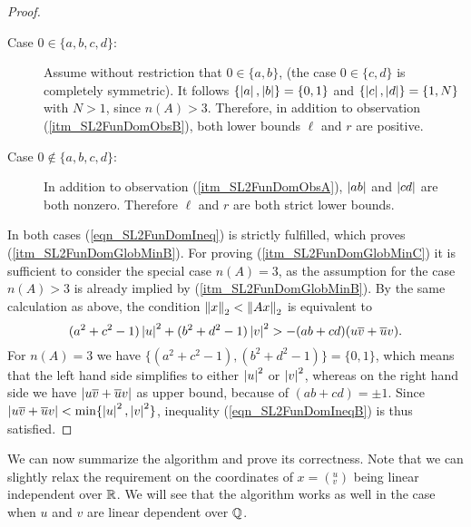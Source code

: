 \begin{proof}
\begin{description}
\item[Case $0 \in \{a,b,c,d\}$:] Assume without restriction that $0 \in \{a,b\}$, (the case $0 \in \{c,d\}$ is completely symmetric). It follows $\{\left|a\right|,\left|b\right|\} = \{0,1\}$ and $\{\left|c\right|,\left|d\right|\} = \{1,N\}$ with $N > 1$, since $n(A) > 3$. Therefore, in addition to observation (\ref{itm_SL2FunDomObsB}), both lower bounds $\ell$ and $r$ are positive. 
\item[Case $0 \notin \{a,b,c,d\}$:] In addition to observation (\ref{itm_SL2FunDomObsA}), $\left|ab\right|$ and $\left|cd\right|$ are both nonzero. Therefore $\ell$ and $r$ are both strict lower bounds.
\end{description}
In both cases (\ref{eqn_SL2FunDomIneq}) is strictly fulfilled, which proves (\ref{itm_SL2FunDomGlobMinB}). For proving (\ref{itm_SL2FunDomGlobMinC}) it is sufficient to consider the special case $n(A) = 3$, as the assumption for the case $n(A) > 3$ is already implied by (\ref{itm_SL2FunDomGlobMinB}). By the same calculation as above, the condition $\left\| x \right\|_2 < \left\| Ax \right\|_2$ is equivalent to
\begin{equation}
\label{eqn_SL2FunDomIneqB}
(a^2 + c^2 - 1)\left|u\right|^2 + (b^2 + d^2 - 1)\left|v\right|^2 > -(ab + cd)(u\overline{v} + \overline{u}v).
\end{equation}
For $n(A) = 3$ we have $\{(a^2 + c^2 - 1),(b^2 + d^2 - 1)\} = \{0,1\}$, which means that the left hand side simplifies to either $\left|u\right|^2$ or $\left|v\right|^2$, whereas on the right hand side we have $\left|u\overline{v} + \overline{u}v\right|$ as upper bound, because of $(ab + cd) = \pm 1$. Since $\left|u\overline{v} + \overline{u}v\right| < \min\{\left|u\right|^2,\left|v\right|^2\}$, inequality (\ref{eqn_SL2FunDomIneqB}) is thus satisfied.
\end{proof}

We can now summarize the algorithm and prove its correctness. Note that we can slightly relax the requirement on the coordinates of $x = ({}^u_v)$ being linear independent over $\mathbb{R}$. We will see that the algorithm works as well in the case when $u$ and $v$ are linear dependent over $\mathbb{Q}$.

